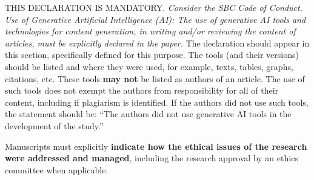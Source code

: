\documentclass[english]{sbcreviews-2025}%
\begin{document}
\begin{declarations}
\begin{aitools}
THIS DECLARATION IS MANDATORY.
\textit{Consider the SBC Code of Conduct.
Use of Generative Artificial Intelligence (AI):
The use of generative AI tools and technologies for content generation,
in writing and/or reviewing the content of articles, must be explicitly declared in the paper.}
The declaration should appear in this section, specifically defined for this purpose.
The tools (and their versions) should be listed and where they were used, for example,
texts, tables, graphs, citations, etc.
These tools \textbf{may not} be listed as authors of an article.
The use of such tools does not exempt the authors from responsibility
for all of their content, including if plagiarism is identified.
%
If the authors did not use such tools, the statement should be:
``The authors did not use generative AI tools in the development of the study.''
\end{aitools}

\begin{furtherinformation}
Manuscripts must explicitly
\textbf{indicate how the ethical issues of the research were addressed and managed},
including the research approval by an ethics committee when applicable.
\end{furtherinformation}

\end{declarations}



\end{document}
